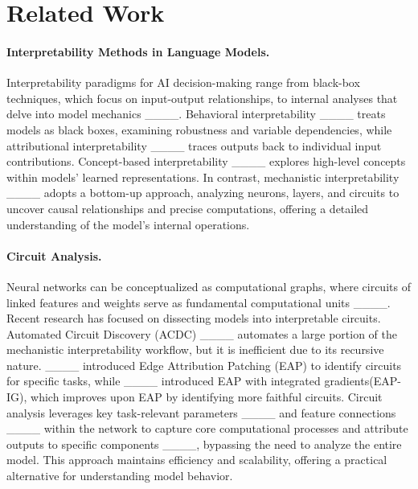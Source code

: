 \section{Related Work}
\paragraph{Interpretability Methods in Language Models.} Interpretability paradigms for AI decision-making range from black-box techniques, which focus on input-output relationships, to internal analyses that delve into model mechanics ____. Behavioral interpretability ____ treats models as black boxes, examining robustness and variable dependencies, while attributional interpretability ____ traces outputs back to individual input contributions. Concept-based interpretability ____ explores high-level concepts within models' learned representations. In contrast, mechanistic interpretability ____ adopts a bottom-up approach, analyzing neurons, layers, and circuits to uncover causal relationships and precise computations, offering a detailed understanding of the model's internal operations.

\paragraph{Circuit Analysis.} Neural networks can be conceptualized as computational graphs, where circuits of linked features and weights serve as fundamental computational units ____. Recent research has focused on dissecting models into interpretable circuits. Automated Circuit Discovery (ACDC) ____ automates a large portion of the mechanistic interpretability workflow, but it is inefficient due to its recursive nature. ____ introduced Edge Attribution Patching (EAP) to identify circuits for specific tasks, while ____ introduced EAP with integrated gradients(EAP-IG), which improves upon EAP by identifying more faithful circuits. Circuit analysis leverages key task-relevant parameters ____ and feature connections ____ within the network to capture core computational processes and attribute outputs to specific components ____, bypassing the need to analyze the entire model. This approach maintains efficiency and scalability, offering a practical alternative for understanding model behavior.

